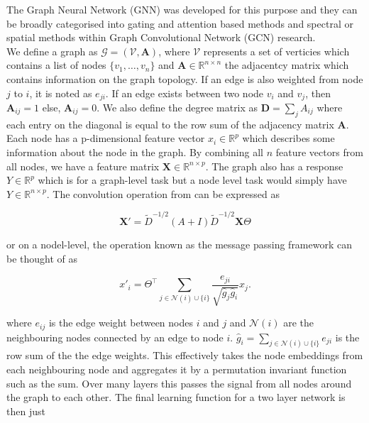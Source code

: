 \documentclass[honours,12pt]{unswthesis}
\numberwithin{equation}{section}
\begin{document}
{\noindent}The Graph Neural Network (GNN) was developed for this purpose and they can be broadly categorised into gating and attention based methods\cite{veličković2018graph} 
and spectral or spatial methods within Graph Convolutional Network (GCN) research.\cite{kipf2017semisupervised} \\

{\noindent}We define a graph as ${\mathcal{G}} = ({\mathcal{V}}, \textbf{A})$, where $\mathcal{V}$ represents a set of verticies which contains a list of nodes
$\{ v_1, \dots, v_n \}$ and $\textbf{A} \in \mathbb{R}^{n \times n}$ the adjacentcy matrix which contains information on the graph topology.
If an edge is also weighted from node $j$ to $i$, it is noted as $e_{ji}$.
If an edge exists between two node $v_i$ and $v_j$, then $\textbf{A}_{ij} = 1$ else, $\textbf{A}_{ij} = 0$. 
We also define the degree matrix as $\mathbf{D} = \sum_{j}A_{ij}$ where each entry on the diagonal is equal to the row sum of the adjacency matrix $\textbf{A}$.  
Each node has a {p}-dimensional feature vector ${x_i} \in \mathbb{R}^{p}$ which describes some information about the node in the graph. 
By combining all ${n}$ feature vectors from all nodes, we have a feature matrix $\textbf{X} \in \mathbb{R}^{n\times p}$. 
The graph also has a response ${Y} \in \mathbb{R}^p$ which is for a graph-level task but a node level task would simply have ${Y} \in \mathbb{R}^{n\times p}$.
The convolution operation from\cite{kipf2017semisupervised} can be expressed as

\begin{equation}
\mathbf{X'} = \tilde{D}^{-1/2} (A + I) \tilde{D}^{-1/2} \textbf{X} \Theta
\end{equation}

\noindent or on a nodel-level, the operation known as the message passing framework can be thought of as

\begin{equation}
    x'_i = \Theta^\top \sum_{j\in \mathcal{N}(i) \cup \{i\}} \frac{e_{ji}}{\sqrt{\hat{g}_j \hat{g}_i}} x_j.
\end{equation}

\noindent where $e_{ij}$ is the edge weight between nodes $i$ and $j$ and $\mathcal{N}(i)$ are the neighbouring nodes connected by an edge to node $i$. 
$\hat{g}_i = \sum_{j\in \mathcal{N}(i) \cup \{i\}} e_{ji}$ is the row sum of the the edge weights.
This effectively takes the node embeddings from each neighbouring node and aggregates it by a permutation invariant function such as the sum. 
Over many layers this passes the signal from all nodes around the graph to each other.\cite{sanchez-lengeling2021a}
The final learning function for a two layer network is then just
\end{document}

